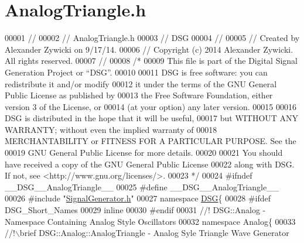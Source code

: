\hypertarget{_analog_triangle_8h_source}{\section{Analog\+Triangle.\+h}
\label{_analog_triangle_8h_source}
}

\begin{DoxyCode}
00001 \textcolor{comment}{//}
00002 \textcolor{comment}{//  AnalogTriangle.h}
00003 \textcolor{comment}{//  DSG}
00004 \textcolor{comment}{//}
00005 \textcolor{comment}{//  Created by Alexander Zywicki on 9/17/14.}
00006 \textcolor{comment}{//  Copyright (c) 2014 Alexander Zywicki. All rights reserved.}
00007 \textcolor{comment}{//}
00008 \textcolor{comment}{/*}
00009 \textcolor{comment}{ This file is part of the Digital Signal Generation Project or “DSG”.}
00010 \textcolor{comment}{}
00011 \textcolor{comment}{ DSG is free software: you can redistribute it and/or modify}
00012 \textcolor{comment}{ it under the terms of the GNU General Public License as published by}
00013 \textcolor{comment}{ the Free Software Foundation, either version 3 of the License, or}
00014 \textcolor{comment}{ (at your option) any later version.}
00015 \textcolor{comment}{}
00016 \textcolor{comment}{ DSG is distributed in the hope that it will be useful,}
00017 \textcolor{comment}{ but WITHOUT ANY WARRANTY; without even the implied warranty of}
00018 \textcolor{comment}{ MERCHANTABILITY or FITNESS FOR A PARTICULAR PURPOSE.  See the}
00019 \textcolor{comment}{ GNU General Public License for more details.}
00020 \textcolor{comment}{}
00021 \textcolor{comment}{ You should have received a copy of the GNU General Public License}
00022 \textcolor{comment}{ along with DSG.  If not, see <http://www.gnu.org/licenses/>.}
00023 \textcolor{comment}{ */}
00024 \textcolor{preprocessor}{#ifndef \_\_DSG\_\_AnalogTriangle\_\_}
00025 \textcolor{preprocessor}{#define \_\_DSG\_\_AnalogTriangle\_\_}
00026 \textcolor{preprocessor}{#include "\hyperlink{_signal_generator_8h}{SignalGenerator.h}"}
00027 \textcolor{keyword}{namespace }\hyperlink{namespace_d_s_g}{DSG}\{
00028 \textcolor{preprocessor}{#ifdef DSG\_Short\_Names}
00029     \textcolor{keyword}{inline}
00030 \textcolor{preprocessor}{#endif}
00031 \textcolor{comment}{    //! DSG::Analog - Namespace Containing Analog Style Oscillators}
00032 \textcolor{comment}{}    \textcolor{keyword}{namespace }Analog\{\textcolor{comment}{}
00033 \textcolor{comment}{        //!\(\backslash\)brief DSG::Analog::AnalogTriangle - Analog Syle Triangle Wave Generator}

\end{DoxyCode}
